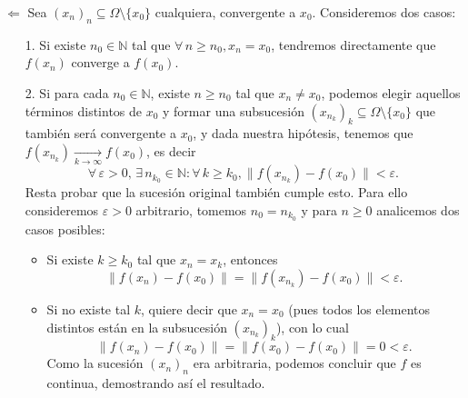 \documentclass[letterpaper,11pt]{article}
\newcommand{\conv}[2]{\xrightarrow[#1\to#2]{}}
\newcommand{\pmi}{\Longleftarrow}
\newcommand{\N}{\mathbb{N}}
\newcommand{\norm}[1]{\lVert #1\rVert }
\begin{document}
\begin{enumerate}
\underline{$\pmi$} Sea $(x_n)_n \subseteq \Omega\setminus\{x_0\}$ cualquiera, convergente a $x_0$. Consideremos dos casos:
\begin{enumerate}
    \item[1.] Si existe $n_0\in\N$ tal que $\forall\,n\geq n_0, x_n=x_0$, tendremos directamente que $f(x_n)$ converge a $f(x_0)$.
    \item[2.] Si para cada $n_0\in\N$, existe $n\geq n_0$ tal que $x_n\neq x_0$, podemos elegir aquellos términos distintos de $x_0$ y formar una subsucesión $(x_{n_k})_k\subseteq \Omega\setminus\{x_0\}$ que también será convergente a $x_0$, y dada nuestra hipótesis, tenemos que $f(x_{n_k})\conv{k}{\infty}f(x_0)$, es decir
    \begin{equation}
    \forall\,\varepsilon>0,\,\exists\,n_{k_0}\in\N : \forall\,k\geq k_0, \norm{f(x_{n_k})-f(x_0)}<\varepsilon.
    \end{equation}
    Resta probar que la sucesión original también cumple esto. Para ello consideremos $\varepsilon>0$ arbitrario, tomemos $n_0=n_{k_0}$ y para $n\geq0$ analicemos dos casos posibles:
    \begin{itemize}
        \item Si existe $k\geq k_0$ tal que $x_n=x_k$, entonces
        \[\norm{f(x_{n})-f(x_0)}=\norm{f(x_{n_k})-f(x_0)}<\varepsilon.\]
        \item Si no existe tal $k$, quiere decir que $x_n=x_0$ (pues todos los elementos distintos están en la subsucesión $(x_{n_k})_k$), con lo cual 
        \[\norm{f(x_{n})-f(x_0)}=\norm{f(x_{0})-f(x_0)}=0<\varepsilon.  \]
        Como la sucesión $(x_n)_n$ era  arbitraria, podemos concluir que $f$ es continua, demostrando así el resultado.
    \end{itemize}
\end{enumerate}


\end{enumerate}
\end{document}
